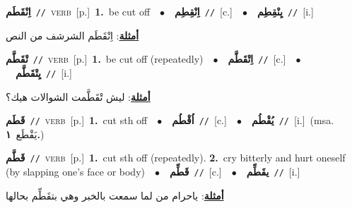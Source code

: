 \documentclass[10pt,a4paper,twoside]{article} %
\begin{document}
\begin{multicols}{2}
{\setlength\topsep{0pt}\textbf{\foreignlanguage{arabic}{اِنْقَطَم}}\ {\color{gray}\texttt{//}\color{black}}\ \textsc{verb}\ [p.]\ \textbf{1.}~be cut off\ \ $\bullet$\ \ \setlength\topsep{0pt}\textbf{\foreignlanguage{arabic}{اِنْقِطِم}}\ {\color{gray}\texttt{//}\color{black}}\ [c.]\ \ $\bullet$\ \ \setlength\topsep{0pt}\textbf{\foreignlanguage{arabic}{يِنْقِطِم}}\ {\color{gray}\texttt{//}\color{black}}\ [i.]\  \begin{flushright}\color{gray}\foreignlanguage{arabic}{\textbf{\underline{\foreignlanguage{arabic}{أمثلة}}}: اِنْقَطَم الشرشف من النص}\end{flushright}\color{black}} \vspace{2mm}

{\setlength\topsep{0pt}\textbf{\foreignlanguage{arabic}{تْقَطَّم}}\ {\color{gray}\texttt{//}\color{black}}\ \textsc{verb}\ [p.]\ \textbf{1.}~be cut off (repeatedly)\ \ $\bullet$\ \ \setlength\topsep{0pt}\textbf{\foreignlanguage{arabic}{اِتْقَطَّم}}\ {\color{gray}\texttt{//}\color{black}}\ [c.]\ \ $\bullet$\ \ \setlength\topsep{0pt}\textbf{\foreignlanguage{arabic}{يِتْقَطَّم}}\ {\color{gray}\texttt{//}\color{black}}\ [i.]\  \begin{flushright}\color{gray}\foreignlanguage{arabic}{\textbf{\underline{\foreignlanguage{arabic}{أمثلة}}}: ليش تْقَطَّمت الشوالات هيك؟}\end{flushright}\color{black}} \vspace{2mm}

{\setlength\topsep{0pt}\textbf{\foreignlanguage{arabic}{قَطَم}}\ {\color{gray}\texttt{//}\color{black}}\ \textsc{verb}\ [p.]\ \textbf{1.}~cut sth off\ \ $\bullet$\ \ \setlength\topsep{0pt}\textbf{\foreignlanguage{arabic}{اُقْطُم}}\ {\color{gray}\texttt{//}\color{black}}\ [c.]\ \ $\bullet$\ \ \setlength\topsep{0pt}\textbf{\foreignlanguage{arabic}{يُقْطُم}}\ {\color{gray}\texttt{//}\color{black}}\ [i.]\ \color{gray}(msa. \foreignlanguage{arabic}{يَقْطَع}~\foreignlanguage{arabic}{\textbf{١.}})\color{black}\ } \vspace{2mm}

{\setlength\topsep{0pt}\textbf{\foreignlanguage{arabic}{قَطَّم}}\ {\color{gray}\texttt{//}\color{black}}\ \textsc{verb}\ [p.]\ \textbf{1.}~cut sth off (repeatedly).  \textbf{2.}~cry bitterly and hurt oneself (by slapping one's face or body)\ \ $\bullet$\ \ \setlength\topsep{0pt}\textbf{\foreignlanguage{arabic}{قَطِّم}}\ {\color{gray}\texttt{//}\color{black}}\ [c.]\ \ $\bullet$\ \ \setlength\topsep{0pt}\textbf{\foreignlanguage{arabic}{يقَطِّم}}\ {\color{gray}\texttt{//}\color{black}}\ [i.]\  \begin{flushright}\color{gray}\foreignlanguage{arabic}{\textbf{\underline{\foreignlanguage{arabic}{أمثلة}}}: ياحرام من لما سمعت بالخبر وهي بتقَطِّم بحالها}\end{flushright}\color{black}} \vspace{2mm}


\end{multicols}
\end{document}
